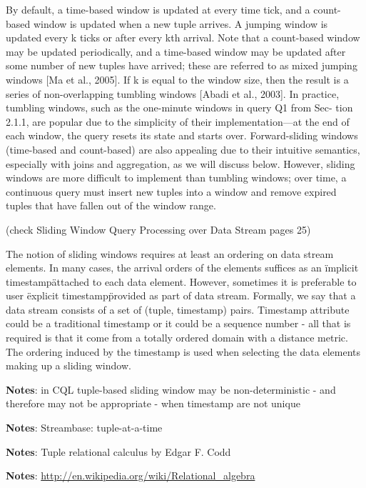 By default, a time-based window is updated at every time tick, and a count-based window is updated when a new tuple arrives. A jumping window is updated every k ticks or after every kth arrival. Note that a count-based window may be updated periodically, and a time-based window may be updated after some number of new tuples have arrived; these are referred to as mixed jumping windows [Ma et al., 2005]. If k is equal to the window size, then the result is a series of non-overlapping tumbling windows [Abadi et al., 2003].
In practice, tumbling windows, such as the one-minute windows in query Q1 from Sec- tion 2.1.1, are popular due to the simplicity of their implementation—at the end of each window, the query resets its state and starts over. Forward-sliding windows (time-based and count-based) are also appealing due to their intuitive semantics, especially with joins and aggregation, as we will discuss below. However, sliding windows are more difficult to implement than tumbling windows; over time, a continuous query must insert new tuples into a window and remove expired tuples that have fallen out of the window range.


(check Sliding Window Query Processing over Data Stream pages 25)




The notion of sliding windows requires at least an ordering on data stream elements. In many cases, the arrival orders of the elements suffices as an \"implicit timestamp\" attached to each data element. However, sometimes it is preferable to user \"explicit timestamp\" provided as part of data stream. Formally, we say that a data stream consists of a set of (tuple, timestamp) pairs. Timestamp attribute could be a traditional timestamp or it could be a sequence number - all that is required is that it come from a totally ordered domain with a distance metric. The ordering induced by the timestamp is used when selecting the data elements making up a sliding window. 


\textbf{Notes}: in CQL tuple-based sliding window may be non-deterministic - and therefore may not be appropriate - when timestamp are not unique

\textbf{Notes}: Streambase: tuple-at-a-time

\textbf{Notes}: Tuple relational calculus by Edgar F. Codd

\textbf{Notes}: \href{http://en.wikipedia.org/wiki/Relational\_algebra}{http://en.wikipedia.org/wiki/Relational\_algebra}

